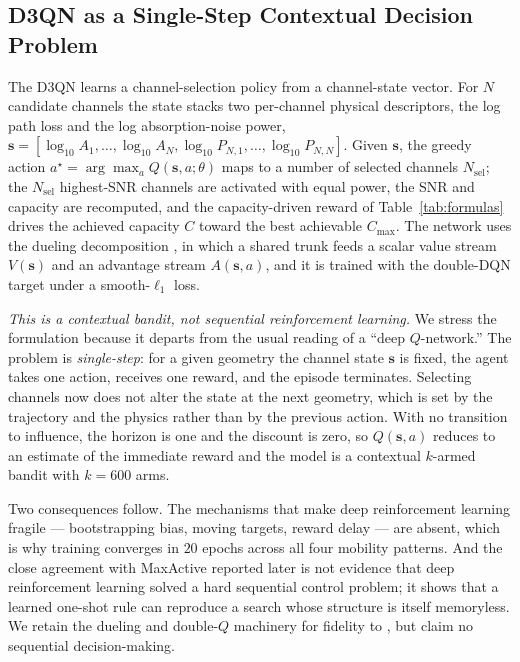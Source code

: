 \documentclass[journal]{IEEEtran}
\begin{document}
\subsection{D3QN as a Single-Step Contextual Decision Problem}
\label{sec:d3qn}
The D3QN learns a channel-selection policy from a channel-state vector. For $N$
candidate channels the state stacks two per-channel physical descriptors, the log path
loss and the log absorption-noise power,
$\mathbf{s}=[\log_{10}A_1,\dots,\log_{10}A_N,\log_{10}P_{N,1},\dots,\log_{10}P_{N,N}]$.
Given $\mathbf{s}$, the greedy action $a^\star=\arg\max_a Q(\mathbf{s},a;\theta)$ maps to
a number of selected channels $N_{\text{sel}}$; the $N_{\text{sel}}$ highest-SNR channels
are activated with equal power, the SNR and capacity are recomputed, and the
capacity-driven reward of Table~\ref{tab:formulas} drives the achieved capacity $C$
toward the best achievable $C_{\max}$. The network uses the dueling decomposition
\cite{wang}, in which a shared trunk feeds a scalar value stream $V(\mathbf{s})$ and an
advantage stream $A(\mathbf{s},a)$, and it is trained with the double-DQN target
\cite{vanhasselt,mnih} under a smooth-$\ell_1$ loss.

\emph{This is a contextual bandit, not sequential reinforcement learning.} We stress the
formulation because
it departs from the usual reading of a ``deep $Q$-network.'' The problem is
\emph{single-step}: for a given geometry the channel state $\mathbf{s}$ is fixed, the
agent takes one action, receives one reward, and the episode terminates. Selecting
channels now does not alter the state at the next geometry, which is set by the trajectory
and the physics rather than by the previous action. With no transition to influence, the
horizon is one and the discount is zero, so $Q(\mathbf{s},a)$ reduces to an estimate of
the immediate reward and the model is a contextual $k$-armed bandit with $k=600$ arms.

Two consequences follow. The mechanisms that make deep reinforcement learning fragile ---
bootstrapping bias, moving targets, reward delay --- are absent, which is why training
converges in $20$ epochs across all four mobility patterns. And the close agreement with
MaxActive reported later is not evidence that deep reinforcement learning solved a hard
sequential control problem; it shows that a learned one-shot rule can reproduce a search
whose structure is itself memoryless. We retain the dueling and double-$Q$ machinery for
fidelity to \cite{wang,vanhasselt}, but claim no sequential decision-making.
\end{document}
